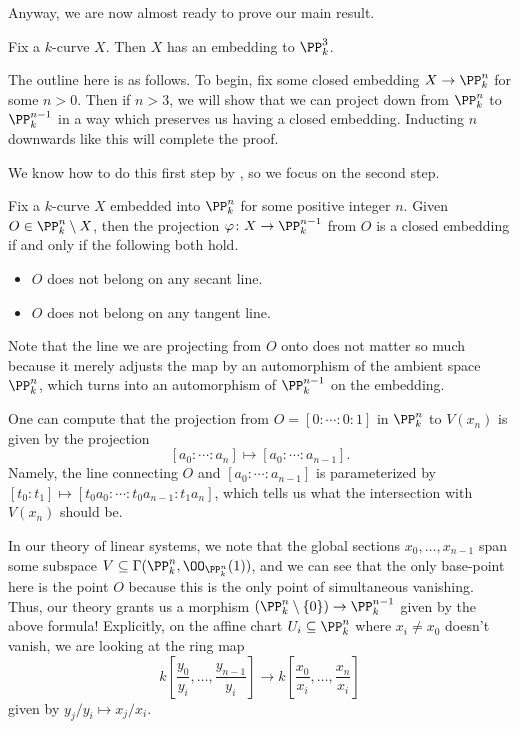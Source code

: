 \documentclass[../notes.tex]{subfiles}
\begin{document}
Anyway, we are now almost ready to prove our main result.
\begin{theorem} \label{thm:x-to-p3}
	Fix a $k$-curve $X$. Then $X$ has an embedding to $\PP^3_k$.
\end{theorem}
The outline here is as follows. To begin, fix some closed embedding $X\to\PP^n_k$ for some $n>0$. Then if $n>3$, we will show that we can project down from $\PP^n_k$ to $\PP^{n-1}_k$ in a way which preserves us having a closed embedding. Inducting $n$ downwards like this will complete the proof.

We know how to do this first step by , so we focus on the second step.
\begin{proposition} \label{prop:project-curve-down}
	Fix a $k$-curve $X$ embedded into $\PP^n_k$ for some positive integer $n$. Given $O\in\PP^n_k\setminus X$, then the projection $\varphi\colon X\to\PP^{n-1}_k$ from $O$ is a closed embedding if and only if the following both hold.
	\begin{itemize}
		\item $O$ does not belong on any secant line.
		\item $O$ does not belong on any tangent line.
	\end{itemize}
\end{proposition}
Note that the line we are projecting from $O$ onto does not matter so much because it merely adjusts the map by an automorphism of the ambient space $\PP^n_k$, which turns into an automorphism of $\PP^{n-1}_k$ on the embedding.
\begin{example}
	One can compute that the projection from $O=[0:\cdots:0:1]$ in $\PP^n_k$ to $V(x_n)$ is given by the projection
	\[[a_0:\cdots:a_n]\mapsto[a_0:\cdots:a_{n-1}].\]
	Namely, the line connecting $O$ and $[a_0:\cdots:a_{n-1}]$ is parameterized by $[t_0:t_1]\mapsto[t_0a_0:\cdots:t_0a_{n-1}:t_1a_n]$, which tells us what the intersection with $V(x_n)$ should be.

	In our theory of linear systems, we note that the global sections $x_0,\ldots,x_{n-1}$ span some subspace $V\subseteq\Gamma(\PP^n_k,\OO_{\PP^n_k}(1))$, and we can see that the only base-point here is the point $O$ because this is the only point of simultaneous vanishing. Thus, our theory grants us a morphism $(\PP^n_k\setminus\{0\})\to\PP^{n-1}_k$ given by the above formula! Explicitly, on the affine chart $U_i\subseteq\PP^n_k$ where $x_i\ne x_0$ doesn't vanish, we are looking at the ring map
	\[k\left[\frac{y_0}{y_i},\ldots,\frac{y_{n-1}}{y_i}\right]\to k\left[\frac{x_0}{x_i},\ldots,\frac{x_n}{x_i}\right]\]
	given by $y_j/y_i\mapsto x_j/x_i$.
\end{example}
\end{document}
